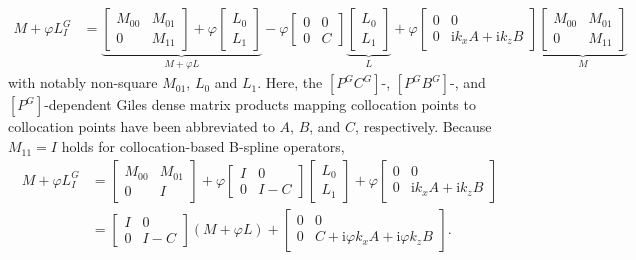 \documentclass[letterpaper,11pt,nointlimits,reqno,draft]{amsbook}
\newcommand{\ii}{\ensuremath{\mathrm{i}}}
\begin{document}
\begin{align}
    \label{eq:dimeulertransformevolve_linearpartition}
    M + \varphi{}L_I^G
&=
    \underbrace{
    \begin{bmatrix} M_{00} & M_{01} \\ 0 & M_{11} \end{bmatrix}
    +
    \varphi
    \begin{bmatrix} L_{0} \\ L_{1} \end{bmatrix}
    }_{M + \varphi{}L}
    -
    \varphi
    \begin{bmatrix} 0 & 0 \\ 0 & C \end{bmatrix}
    \underbrace{
    \begin{bmatrix} L_{0} \\ L_{1} \end{bmatrix}
    }_L
    +
    \varphi
    \begin{bmatrix} 0 & 0 \\ 0 & \ii k_x A + \ii k_z B \end{bmatrix}
    \underbrace{
    \begin{bmatrix} M_{00} & M_{01} \\ 0 & M_{11} \end{bmatrix}
    }_M
\end{align}
with notably non-square $M_{01}$, $L_0$ and $L_1$.  Here, the $\left[P^G
C^G\right]$-, $\left[P^G B^G\right]$-, and $\left[P^G\right]$-dependent Giles
dense matrix products mapping collocation points to collocation points have been
abbreviated to $A$, $B$, and $C$, respectively. Because $M_{11} = I$ holds for
collocation-based B-spline operators,
\begin{align}
    M + \varphi{}L_I^G
&=
    \begin{bmatrix} M_{00} & M_{01} \\ 0 & I \end{bmatrix}
    +
    \varphi
    \begin{bmatrix} I & 0 \\ 0 & I - C \end{bmatrix}
    \begin{bmatrix} L_{0} \\ L_{1} \end{bmatrix}
    +
    \varphi
    \begin{bmatrix} 0 & 0 \\ 0 & \ii k_x A + \ii k_z B \end{bmatrix}
\\
&=
    \label{eq:dimeulertransformevolve_linearfact}
    \begin{bmatrix} I & 0 \\ 0 & I - C \end{bmatrix}
    \left(M + \varphi{}L\right)
    +
    \begin{bmatrix}
        0 & 0 \\
        0 & C + \ii \varphi{} k_x A + \ii \varphi{} k_z B
    \end{bmatrix}.
\end{align}
\end{document}

